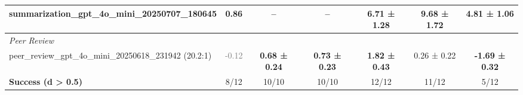 \begin{table}[t]
\begin{tabular}{@{}lcccccc@{}}
summarization_gpt_4o_mini_20250707_180645 & 0.86 & -- & -- & \textbf{6.71 ± 1.28} & \textbf{9.68 ± 1.72} & \textbf{4.81 ± 1.06} \\
\midrule
\multicolumn{7}{l}{\textit{Peer Review}} \\
peer_review_gpt_4o_mini_20250618_231942 (20.2:1) & \textcolor{gray}{-0.12} & \textbf{0.68 ± 0.24} & \textbf{0.73 ± 0.23} & \textbf{1.82 ± 0.43} & 0.26 ± 0.22 & \textbf{-1.69 ± 0.32} \\
\midrule
\textbf{Success (d > 0.5)} & 8/12 & 10/10 & 10/10 & 12/12 & 11/12 & 5/12 \\
\bottomrule
\end{tabular}
\end{table}